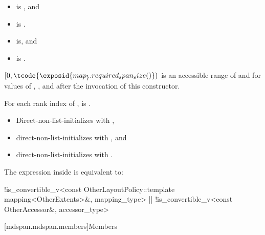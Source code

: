 \begin{itemdescr}
\pnum
\constraints
\begin{itemize}
\item
{}
is , and
\item
{} is .
\end{itemize}

\pnum
\mandates
\begin{itemize}
\item
{} is\newline {}, and
\item
{} is .
\end{itemize}

\pnum
\expects
$[0, \tcode{\exposid{map_}.required_span_size()})$ is
an accessible range of  and 
for values of , , and 
after the invocation of this constructor.

\pnum
\hardexpects
For each rank index  of ,
is .

\pnum
\effects
\begin{itemize}
\item
Direct-non-list-initializes  with ,
\item
direct-non-list-initializes  with , and
\item
direct-non-list-initializes  with .
\end{itemize}

\pnum
\remarks
The expression inside  is equivalent to:
\begin{codeblock}
!is_convertible_v<const OtherLayoutPolicy::template mapping<OtherExtents>&, mapping_type>
|| !is_convertible_v<const OtherAccessor&, accessor_type>
\end{codeblock}
\end{itemdescr}

[mdspan.mdspan.members]{Members}

